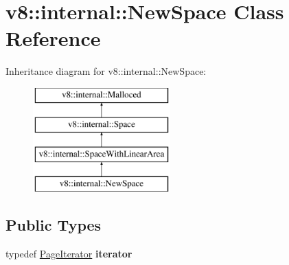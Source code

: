 \hypertarget{classv8_1_1internal_1_1NewSpace}{}\section{v8\+:\+:internal\+:\+:New\+Space Class Reference}
\label{classv8_1_1internal_1_1NewSpace}
Inheritance diagram for v8\+:\+:internal\+:\+:New\+Space\+:\begin{figure}[H]
\begin{center}
\leavevmode
\includegraphics[height=4.000000cm]{classv8_1_1internal_1_1NewSpace}
\end{center}
\end{figure}
\subsection*{Public Types}
\begin{DoxyCompactItemize}
\item 
\mbox{\label{classv8_1_1internal_1_1NewSpace_abad89103f6eb4a26dd50b074f9737f6d}} 
typedef \mbox{\hyperlink{classv8_1_1internal_1_1PageIteratorImpl}{Page\+Iterator}} {\bfseries iterator}
\end{DoxyCompactItemize}
